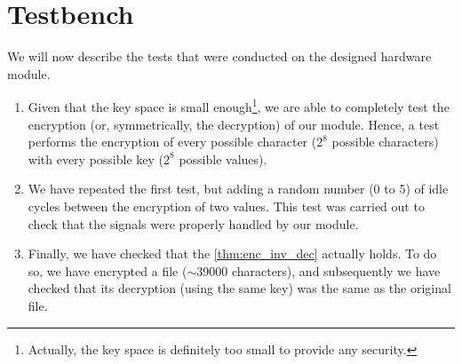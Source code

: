 \section{Testbench}
\label{sec:tests}
We will now describe the tests that were conducted on the designed hardware module.

\begin{enumerate}
    \item Given that the key space is small enough\footnote{Actually, the key space is definitely too small to provide any security.}, we are able to completely test the encryption (or, symmetrically, the decryption) of our module. Hence, a test performs the encryption of every possible character ($2^8$ possible characters) with every possible key ($2^8$ possible values).
    \item We have repeated the first test, but adding a random number (0 to 5) of idle cycles between the encryption of two values. This test was carried out to check that the signals were properly handled by our module.
    \item Finally, we have checked that the \cref{thm:enc_inv_dec} actually holds. To do so, we have encrypted a file ($\sim$39000 characters), and subsequently we have checked that its decryption (using the same key) was the same as the original file.
\end{enumerate}